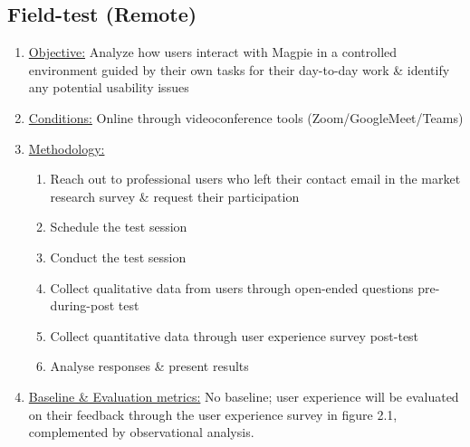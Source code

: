 \documentclass{report}
\begin{document}
\subsection{Field-test (Remote)}
\begin{enumerate}
    \item \underline{Objective:} Analyze how users interact with Magpie in a
          controlled environment guided by their own tasks for their day-to-day work
          \& identify any potential usability issues
    \item \underline{Conditions:} Online through videoconference tools
          (Zoom/GoogleMeet/Teams)
    \item \underline{Methodology:}
          \begin{enumerate}
              \item Reach out to professional users who left their contact
                    email in the market research survey \& request their participation
              \item Schedule the test session
              \item Conduct the test session
              \item Collect qualitative data from users through open-ended questions pre-during-post test
              \item Collect quantitative data through user experience survey post-test
              \item Analyse responses \& present results
          \end{enumerate}
    \item \underline{Baseline \& Evaluation metrics:} No baseline; user
          experience will be evaluated on their feedback through the user experience survey in figure 2.1, complemented by observational analysis.
\end{enumerate}
\end{document}

